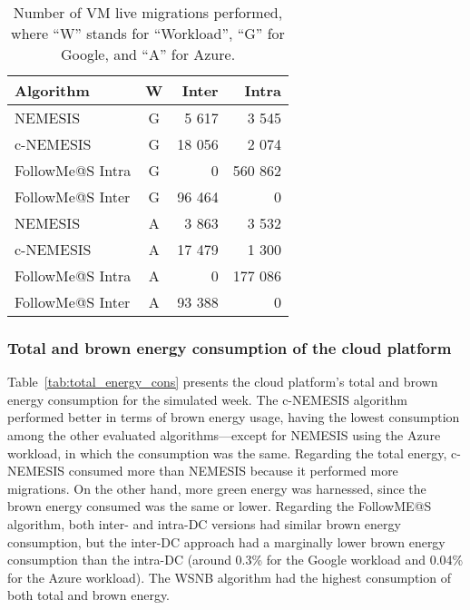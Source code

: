\begin{table}[h]
\caption{Number of VM live migrations performed, where ``W'' stands for ``Workload'', ``G'' for Google, and ``A'' for Azure. }\label{tab:amount_migs} \centering
\begin{tabular}{|l|c|r|r|}
  \hline
  \textbf{Algorithm} & \textbf{W}  & \textbf{Inter} & \textbf{Intra}   \\
  \hline
  NEMESIS  & G & 5 617  & 3 545 \\
  \hline
  c-NEMESIS & G & 18 056  & 2 074 \\
  \hline
  FollowMe@S Intra  & G & 0  & 560 862 \\
  \hline
  FollowMe@S Inter  & G & 96 464 & 0 \\
  \hline
  NEMESIS & A & 3 863 & 3 532 \\
  \hline
  c-NEMESIS & A & 17 479  & 1 300 \\
  \hline
  FollowMe@S Intra  & A & 0  & 177 086 \\
  \hline
  FollowMe@S Inter   & A & 93 388 & 0 \\
  \hline
\end{tabular}
\end{table}

\subsubsection{Total and brown energy consumption of the cloud platform}
\label{sec:energy_smartgreens}

Table~\ref{tab:total_energy_cons} presents the cloud platform's total and brown energy consumption for the simulated week. The c-NEMESIS algorithm performed better in terms of brown energy usage, having the lowest consumption among the other evaluated algorithms---except for NEMESIS using the Azure workload, in which the consumption was the same. Regarding the total energy, c-NEMESIS consumed more than NEMESIS because it performed more migrations. On the other hand, more green energy was harnessed, since the brown energy consumed was the same or lower. Regarding the FollowME@S algorithm, both inter- and intra-DC versions had similar brown energy consumption, but the inter-DC approach had a marginally lower brown energy consumption than the intra-DC (around 0.3\% for the Google workload and 0.04\% for the Azure workload). The WSNB algorithm had the highest consumption of both total and brown energy.

